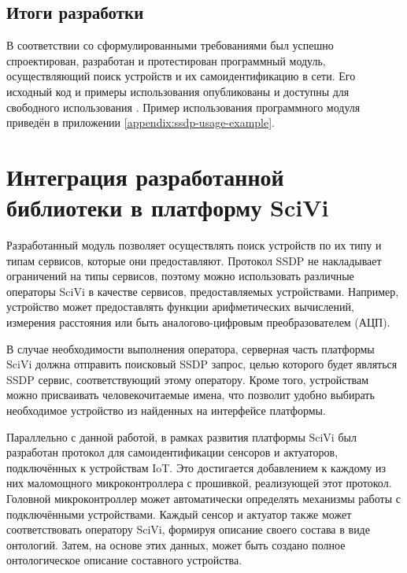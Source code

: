 
\subsection{Итоги разработки}

В соответствии со сформулированными требованиями был успешно спроектирован, разработан и протестирован программный модуль, осуществляющий поиск устройств и их самоидентификацию в сети.
Его исходный код и примеры использования опубликованы и доступны для свободного использования \cite{web:almiluk-ssdp}.
Пример использования программного модуля приведён в приложении \ref{appendix:ssdp-usage-example}.


\section{Интеграция разработанной библиотеки в платформу SciVi}


Разработанный модуль позволяет осуществлять поиск устройств по их типу и типам сервисов, которые они предоставляют.
Протокол SSDP не накладывает ограничений на типы сервисов, поэтому можно использовать различные операторы SciVi в качестве сервисов, предоставляемых устройствами.
Например, устройство может предоставлять функции арифметических вычислений, измерения расстояния или быть аналогово-цифровым преобразователем (АЦП).

В случае необходимости выполнения оператора, серверная часть платформы SciVi должна отправить поисковый SSDP запрос, целью которого будет являться SSDP сервис, соответствующий этому оператору.
Кроме того, устройствам можно присваивать человекочитаемые имена, что позволит удобно выбирать необходимое устройство из найденных на интерфейсе платформы.

Параллельно с данной работой, в рамках развития платформы SciVi был разработан протокол для самоидентификации сенсоров и актуаторов, подключённых к устройствам IoT.
Это достигается добавлением к каждому из них маломощного микроконтроллера с прошивкой, реализующей этот протокол.
Головной микроконтроллер может автоматически определять механизмы работы с подключёнными устройствами.
Каждый сенсор и актуатор также может соответствовать оператору SciVi, формируя описание своего состава в виде онтологий.
Затем, на основе этих данных, может быть создано полное онтологическое описание составного устройства.

